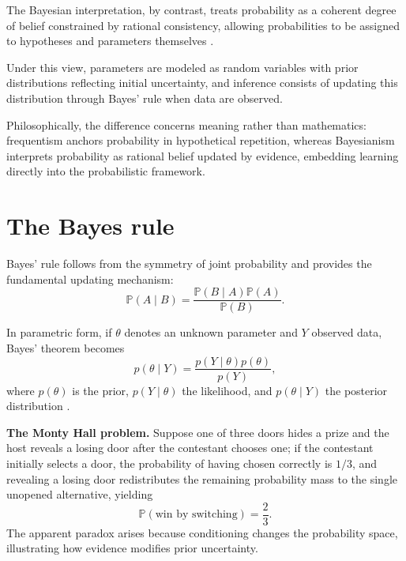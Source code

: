 \medskip

The Bayesian interpretation, by contrast, treats probability as a coherent degree of belief constrained by rational consistency, allowing probabilities to be assigned to hypotheses and parameters themselves \cite{ramsey_1931_foundations,definetti_1974_probability}. 

\medskip

Under this view, parameters are modeled as random variables with prior distributions reflecting initial uncertainty, and inference consists of updating this distribution through Bayes’ rule when data are observed. 

\medskip

Philosophically, the difference concerns meaning rather than mathematics: frequentism anchors probability in hypothetical repetition, whereas Bayesianism interprets probability as rational belief updated by evidence, embedding learning directly into the probabilistic framework. 


\section{The Bayes rule}

Bayes’ rule follows from the symmetry of joint probability and provides the fundamental updating mechanism:
\[
\mathbb{P}(A \mid B) = \frac{\mathbb{P}(B \mid A)\mathbb{P}(A)}{\mathbb{P}(B)}.
\]

\medskip

In parametric form, if \(\theta\) denotes an unknown parameter and \(Y\) observed data, Bayes’ theorem becomes 
\[
p(\theta \mid Y) = \frac{p(Y \mid \theta)p(\theta)}{p(Y)},
\]
where \(p(\theta)\) is the prior, \(p(Y \mid \theta)\) the likelihood, and \(p(\theta \mid Y)\) the posterior distribution \cite{laplace_1812_theorie,jaynes_2003_logic}. 

\medskip

\textbf{The Monty Hall problem.} Suppose one of three doors hides a prize and the host reveals a losing door after the contestant chooses one; if the contestant initially selects a door, the probability of having chosen correctly is \(1/3\), and revealing a losing door redistributes the remaining probability mass to the single unopened alternative, yielding 
\[
\mathbb{P}(\text{win by switching}) = \frac{2}{3}.
\]
The apparent paradox arises because conditioning changes the probability space, illustrating how evidence modifies prior uncertainty. 

